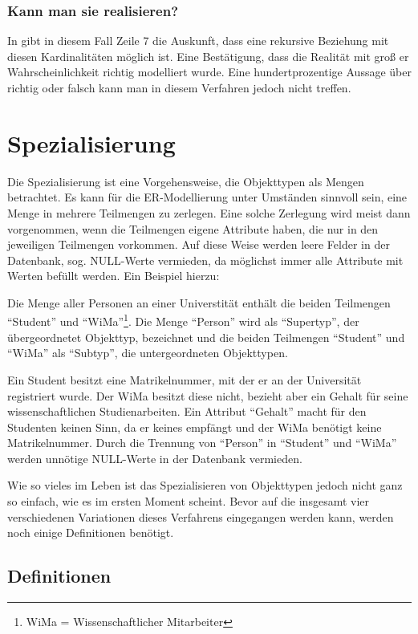 \subsubsection{Kann man sie realisieren?}
In  gibt in diesem Fall Zeile 7 die Auskunft, dass eine rekursive Beziehung mit diesen Kardinalitäten möglich ist. Eine Bestätigung, dass die Realität mit groß er Wahrscheinlichkeit richtig modelliert wurde. Eine hundertprozentige Aussage über richtig oder falsch kann man in diesem Verfahren jedoch nicht treffen.
\section{Spezialisierung}
\label{specialization}
Die Spezialisierung ist eine Vorgehensweise, die Objekttypen als Mengen
betrachtet. Es kann für die ER-Modellierung unter Umständen sinnvoll
sein, eine Menge in mehrere Teilmengen zu zerlegen. Eine solche Zerlegung
wird meist dann vorgenommen, wenn die Teilmengen eigene Attribute haben,
die nur in den jeweiligen Teilmengen vorkommen. Auf diese Weise werden
leere Felder in der Datenbank, sog. NULL-Werte vermieden, da möglichst
immer alle Attribute mit Werten befüllt werden. Ein Beispiel hierzu:

Die Menge aller Personen an einer Universtität enthält die beiden
Teilmengen \enquote{Student} und \enquote{WiMa}\footnote{WiMa =
    Wissenschaftlicher Mitarbeiter}. Die Menge \enquote{Person} wird als
\enquote{Supertyp}, der übergeordnetet Objekttyp, bezeichnet und die
beiden Teilmengen \enquote{Student} und \enquote{WiMa} als
\enquote{Subtyp}, die untergeordneten Objekttypen.

Ein Student besitzt eine Matrikelnummer, mit der er an der Universität
registriert wurde. Der WiMa besitzt diese nicht, bezieht aber ein Gehalt
für seine wissenschaftlichen Studienarbeiten. Ein Attribut
\enquote{Gehalt} macht für den Studenten keinen Sinn, da er keines
empfängt und der WiMa benötigt keine Matrikelnummer. Durch die
Trennung von \enquote{Person} in \enquote{Student} und \enquote{WiMa}
werden unnötige NULL-Werte in der Datenbank vermieden.

Wie so vieles im Leben ist das Spezialisieren von Objekttypen jedoch
nicht ganz so einfach, wie es im ersten Moment scheint. Bevor auf die
insgesamt vier verschiedenen Variationen dieses Verfahrens eingegangen
werden kann, werden noch einige Definitionen benötigt.
\subsection{Definitionen}
